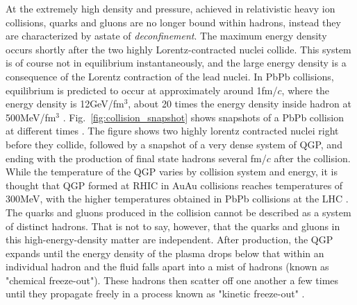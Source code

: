 At the extremely high density and pressure, achieved in relativistic heavy ion collisions, quarks and gluons are no longer bound within hadrons, instead they are characterized by astate of \textit{deconfinement}. The maximum energy density occurs shortly after the two highly Lorentz-contracted nuclei collide.  This system is of course not in equilibrium instantaneously, and the large energy density is a consequence of the Lorentz contraction of the lead nuclei. In PbPb collisions, equilibrium is predicted to occur at approximately around 1fm/$c$, where the energy density is 12GeV/fm$^3$, about 20 times the energy density inside hadron at 500MeV/fm$^3$ \cite{annurev-nucl}. Fig.~\ref{fig:collision_snapshot} shows snapshots of a PbPb collision at different times \cite{annurev-nucl}. The figure shows two highly lorentz contracted nuclei right before they collide, followed by a snapshot of a very dense system of QGP, and ending with the production of final state hadrons several fm/$c$ after the collision. While the temperature of the QGP varies by collision system and energy, it is thought that QGP formed at RHIC in AuAu collisions reaches temperatures of 300MeV, with the higher temperatures obtained in PbPb collisions at the LHC \cite{annurev-nucl}. The quarks and gluons produced in the collision cannot be described as a system of distinct hadrons. That is not to say, however, that the quarks and gluons in this high-energy-density matter are independent. After production, the QGP expands until the energy density of the plasma drops below that within an individual hadron and the fluid falls apart into a mist of hadrons (known as "chemical freeze-out"). These hadrons then scatter off one another a few times until they propagate freely in a process known as "kinetic freeze-out" \cite{annurev-nucl}.

